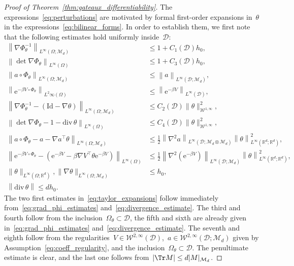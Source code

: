 \documentclass[a4]{article}
\newcommand{\e}{\mathrm{e}}
\renewcommand{\div}{\mathrm{div}}
\newcommand{\R}{\mathbb{R}}
\newcommand{\1}{\mathbbm 1}
\newcommand{\Winf}{{{\cW}^{1,\infty}}}
\newcommand{\Id}{\mathrm{Id}}
\newcommand{\cW}{\mathcal{W}}
\begin{document}
\begin{proof}[Proof of Theorem~\ref{thm:gateaux_differentiability}]
    The expressions~\eqref{eq:perturbations} are motivated by formal first-order expansions in~$\theta$ in the expressions~\eqref{eq:bilinear_forms}.
    In order to establish them, we first note that the following estimates hold uniformly inside~$\mathcal D$:
    \begin{equation}
        \label{eq:taylor_expansions}
        \begin{aligned}
            \left\|\nabla \Phi_\theta^{-1}\right\|_{L^\infty(\Omega;\mathcal M_d)} &\leq 1+C_1(\mathcal D)h_0,\\
            \left\|\det \nabla \Phi_\theta\right\|_{L^\infty(\Omega)} &\leq 1+C_3(\mathcal D)h_0,\\
            \left\|a\circ\Phi_\theta\right\|_{L^\infty(\Omega;\mathcal M_d)}&\leq \left\|a\right\|_{L^\infty(\mathcal D;\mathcal M_d)},\\
            \left\|\e^{-\beta V\circ\Phi_\theta}\right\|_{L^2\infty(\Omega)}&\leq \left\|\e^{-\beta V}\right\|_{L^\infty(\mathcal D)},\\
            \left\|\nabla\Phi_\theta^{-1} - (\Id - \nabla\theta)\right\|_{L^\infty(\Omega;\mathcal M_d)}&\leq C_2(\mathcal D)\|\theta\|^2_{\Winf},\\
            \left\|\det\nabla\Phi_\theta - 1 - \div\,\theta\right\|_{L^\infty(\Omega)}&\leq C_4(\mathcal D)\|\theta\|^2_{\Winf},\\
            \left\|a\circ\Phi_\theta - a- \nabla a^\top\theta\right\|_{L^\infty(\Omega;\mathcal M_d)} & \leq \frac12\left\|\nabla^2 a\right\|_{L^\infty(\mathcal D;\mathcal M_d\otimes \mathcal M_d)}\left\|\theta\right\|^2_{L^\infty(\R^d;\R^d)},\\
            \left\|\e^{-\beta V\circ\Phi_\theta}-\left(\e^{-\beta V}- \beta\nabla V^\top \theta \e^{-\beta V}\right) \right\|_{L^\infty(\Omega)} &\leq \frac12\left\|\nabla^2 \left(\e^{-\beta V}\right)\right\|_{L^\infty(\mathcal D;\mathcal M_d)}\left\|\theta\right\|^2_{L^\infty(\R^d;\R^d)},\\
            \|\theta\|_{L^\infty(\Omega;\R^d)},\|\nabla\theta\|_{L^\infty(\Omega;\mathcal M_d)}&\leq h_0,\\
            \left\|\div\,\theta\right\|\leq d h_0 .
        \end{aligned}
    \end{equation}
    The two first estimates in~\eqref{eq:taylor_expansions} follow immediately from~\eqref{eq:grad_phi_estimates} and~\eqref{eq:divergence_estimate}. The third and fourth follow from the inclusion~$\Omega_\theta\subset \mathcal D$, the fifth and sixth are already given in~\eqref{eq:grad_phi_estimates} and~\eqref{eq:divergence_estimate}. The seventh and eighth follow from the regularities~$V\in \cW^{2,\infty}(\mathcal D)$,~$a\in \cW^{2,\infty}(\mathcal D;\mathcal M_d)$ given by Assumption~\eqref{eq:coeff_regularity}, and the inclusion~$\Omega_\theta\subset\mathcal D$.
    The penultimate estimate is clear, and the last one follows from~$|\Tr M|\leq d|M|_{\mathcal M_d}$.


\end{proof}
\end{document}

